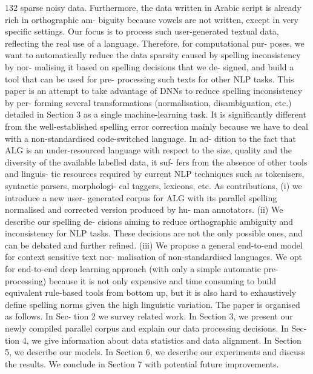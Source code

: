 132 sparse noisy data. Furthermore, the data written in Arabic script is already rich in orthographic am- biguity because vowels are not written, except in very speciﬁc settings. Our focus is to process such user-generated textual data, reﬂecting the real use of a language. Therefore, for computational pur- poses, we want to automatically reduce the data sparsity caused by spelling inconsistency by nor- malising it based on spelling decisions that we de- signed, and build a tool that can be used for pre- processing such texts for other NLP tasks. This paper is an attempt to take advantage of DNNs to reduce spelling inconsistency by per- forming several transformations (normalisation, disambiguation, etc.) detailed in Section 3 as a single machine-learning task. It is signiﬁcantly different from the well-established spelling error correction mainly because we have to deal with a non-standardised code-switched language. In ad- dition to the fact that ALG is an under-resourced language with respect to the size, quality and the diversity of the available labelled data, it suf- fers from the absence of other tools and linguis- tic resources required by current NLP techniques such as tokenisers, syntactic parsers, morphologi- cal taggers, lexicons, etc. As contributions, (i) we introduce a new user- generated corpus for ALG with its parallel spelling normalised and corrected version produced by hu- man annotators. (ii) We describe our spelling de- cisions aiming to reduce orthographic ambiguity and inconsistency for NLP tasks. These decisions are not the only possible ones, and can be debated and further reﬁned. (iii) We propose a general end-to-end model for context sensitive text nor- malisation of non-standardised languages. We opt for end-to-end deep learning approach (with only a simple automatic pre-processing) because it is not only expensive and time consuming to build equivalent rule-based tools from bottom up, but it is also hard to exhaustively deﬁne spelling norms given the high linguistic variation. The paper is organised as follows. In Sec- tion 2 we survey related work. In Section 3, we present our newly compiled parallel corpus and explain our data processing decisions. In Sec- tion 4, we give information about data statistics and data alignment. In Section 5, we describe our models. In Section 6, we describe our experiments and discuss the results. We conclude in Section 7 with potential future improvements.

\vspace{18pt}


